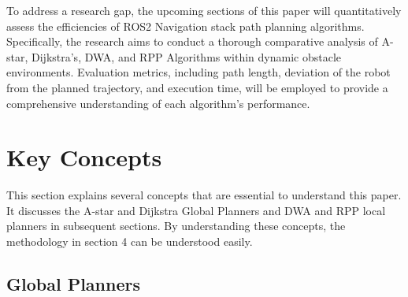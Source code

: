 \documentclass[sigconf]{acmart}
\begin{document}
To address a research gap, the upcoming sections of this paper will quantitatively assess the efficiencies of ROS2 Navigation stack path planning algorithms. Specifically, the research aims to conduct a thorough comparative analysis of A-star, Dijkstra’s, DWA, and RPP Algorithms within dynamic obstacle environments. Evaluation metrics, including path length, deviation of the robot from the planned trajectory, and execution time, will be employed to provide a comprehensive understanding of each algorithm's performance.

\section{Key Concepts}

This section explains several concepts that are essential to understand this paper. It discusses the A-star and Dijkstra Global Planners and DWA and RPP local planners in subsequent sections. By understanding these concepts, the methodology in section 4 can be understood easily.

\subsection{Global Planners}
\end{document}
